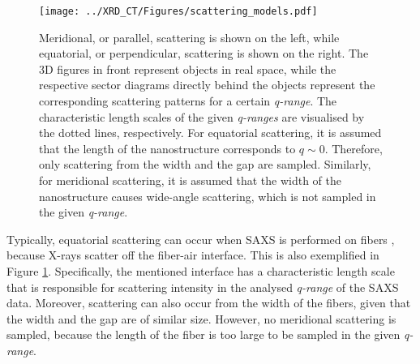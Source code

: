 \begin{figure}

    \centering
    \texttt{[image: ../XRD\_CT/Figures/scattering\_models.pdf]}
    \caption[Meridional and Equatorial Scattering]{Meridional, or parallel, scattering is shown on the left, while equatorial, or perpendicular, scattering is shown on the right.
        The 3D figures in front represent objects in real space, while the respective sector diagrams directly behind the objects represent the corresponding scattering patterns for a certain \emph{q-range}.
        The characteristic length scales of the given \emph{q-ranges} are visualised by the dotted lines, respectively.
        For equatorial scattering, it is assumed that the length of the nanostructure corresponds to $q\sim0$.
        Therefore, only scattering from the width and the gap are sampled.
        Similarly, for meridional scattering, it is assumed that the width of the nanostructure causes wide-angle scattering, which is not sampled in the given \emph{q-range}.
    }
    \label{fig:scattering_models}
\end{figure}

Typically, equatorial scattering can occur when SAXS is performed on fibers \cite{li2013quantitative}, because X-rays scatter off the fiber-air interface.
This is also exemplified in Figure \ref{fig:scattering_models}.
Specifically, the mentioned interface has a characteristic length scale that is responsible for scattering intensity in the analysed \emph{q-range} of the SAXS data.
Moreover, scattering can also occur from the width of the fibers, given that the width and the gap are of similar size.
However, no meridional scattering is sampled, because the length of the fiber is too large to be sampled in the given \emph{q-range}.


